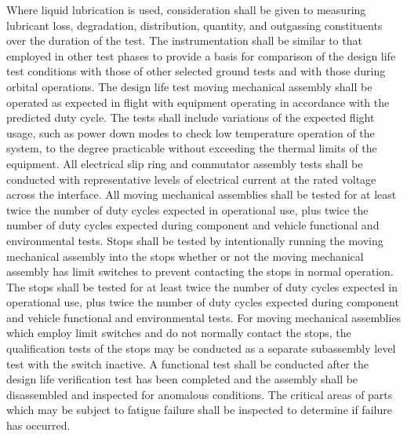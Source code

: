 \documentclass[12pt]{article}
\begin{document}
Where liquid lubrication is used, consideration shall be given to measuring lubricant loss, degradation, distribution, quantity, and outgassing constituents over the duration of the test. 
The instrumentation shall be similar to that employed in other test phases to provide a basis for comparison of the design life test conditions with those of other selected ground tests and with those during orbital operations. 
The design life test moving mechanical assembly shall be operated as expected in flight with equipment operating in accordance with the predicted duty cycle.
The tests shall include variations of the expected flight usage, such as power down modes to check low temperature operation of the system, to the degree practicable without exceeding the thermal limits of the equipment. 
All electrical slip ring and commutator assembly tests shall be conducted with representative levels of electrical current at the rated voltage across the interface. 
All moving mechanical assemblies shall be tested for at least twice the number of duty cycles expected in operational use, plus twice the number of duty cycles expected during component and vehicle functional and environmental tests. 
Stops shall be tested by intentionally running the moving mechanical assembly into the stops whether or not the moving mechanical assembly has limit switches to prevent contacting the stops in normal operation. 
The stops shall be tested for at least twice the number of duty cycles expected in operational use, plus twice the number of duty cycles expected during component and vehicle functional and environmental tests. 
For moving mechanical assemblies which employ limit switches and do not normally contact the stops, the qualification tests of the stops may be conducted as a separate subassembly level test with the switch inactive. 
A functional test shall be conducted after the design life verification test has been completed and the assembly shall be disassembled and inspected for anomalous conditions. 
The critical areas of parts which may be subject to fatigue failure shall be inspected to determine if failure has occurred.
\end{document}
